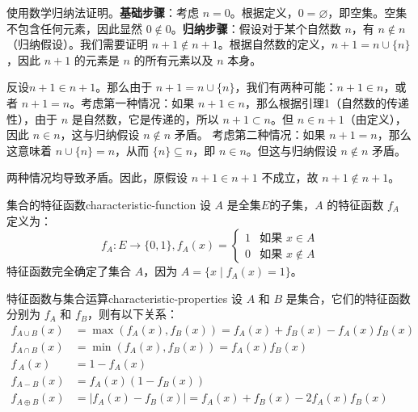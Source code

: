 使用数学归纳法证明。\textbf{基础步骤}：考虑 $n = 0$。根据定义，$0 = \varnothing$，即空集。空集不包含任何元素，因此显然 $0 \notin 0$。\textbf{归纳步骤}：假设对于某个自然数 $n$，有 $n \notin n$（归纳假设）。我们需要证明 $n+1 \notin n+1$。根据自然数的定义，$n+1 = n \cup \{n\}$，因此 $n+1$ 的元素是 $n$ 的所有元素以及 $n$ 本身。

反设$n+1 \in n+1$。那么由于 $n+1 = n \cup \{n\}$，我们有两种可能：$n+1 \in n$，或者 $n+1 = n$。考虑第一种情况：如果 $n+1 \in n$，那么根据引理1（自然数的传递性），由于 $n$ 是自然数，它是传递的，所以 $n+1 \subset n$。但 $n \in n+1$（由定义），因此 $n \in n$，这与归纳假设 $n \notin n$ 矛盾。
考虑第二种情况：如果 $n+1 = n$，那么这意味着 $n \cup \{n\} = n$，从而 $\{n\} \subseteq n$，即 $n \in n$。但这与归纳假设 $n \notin n$ 矛盾。

两种情况均导致矛盾。因此，原假设 $n+1 \in n+1$ 不成立，故 $n+1 \notin n+1$。
\begin{definition}{集合的特征函数}{characteristic-function}
设 $A$ 是全集$E$的子集，$A$ 的特征函数 $f_A$ 定义为：
\[
f_A:E\to\{0,1\},f_A(x) = 
\begin{cases}
1 & \text{如果 } x \in A \\
0 & \text{如果 } x \notin A
\end{cases}
\]
特征函数完全确定了集合 $A$，因为 $A = \{x \mid f_A(x) = 1\}$。
\end{definition}
\begin{theorem}{特征函数与集合运算}{characteristic-properties}
设 $A$ 和 $B$ 是集合，它们的特征函数分别为 $f_A$ 和 $f_B$，则有以下关系：\vspace{-5pt}
\begin{align*}
f_{A \cup B}(x) &= \max(f_A(x), f_B(x)) = f_A(x) + f_B(x) - f_A(x)f_B(x) \\
f_{A \cap B}(x) &= \min(f_A(x), f_B(x)) = f_A(x)f_B(x) \\
f_{~A}(x) &= 1 - f_A(x) \\
f_{A -B}(x) &= f_A(x)(1 - f_B(x)) \\
f_{A \oplus B}(x) &= |f_A(x) - f_B(x)| = f_A(x) + f_B(x) - 2f_A(x)f_B(x)
\end{align*}
\end{theorem}
